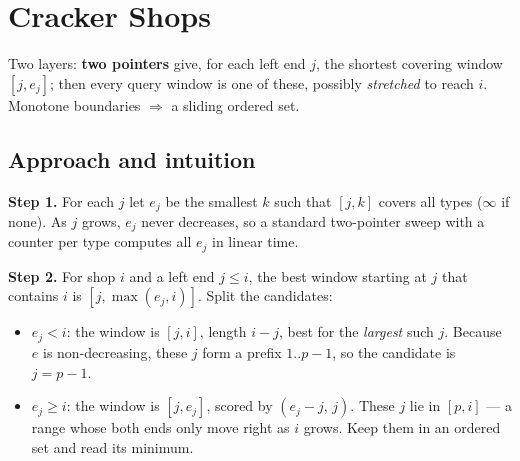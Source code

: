 \section{Cracker Shops}
\label{sec:g-cracker-shops}


\begin{patternbox}
Two layers: \textbf{two pointers} give, for each left end $j$, the shortest
covering window $[j,e_j]$; then every query window is one of these, possibly
\emph{stretched} to reach $i$. Monotone boundaries $\Rightarrow$ a sliding
ordered set.
\end{patternbox}

\subsection*{Approach and intuition}

\textbf{Step 1.} For each $j$ let $e_j$ be the smallest $k$ such that
$[j,k]$ covers all types ($\infty$ if none). As $j$ grows, $e_j$ never
decreases, so a standard two-pointer sweep with a counter per type computes
all $e_j$ in linear time.

\textbf{Step 2.} For shop $i$ and a left end $j\le i$, the best window starting
at $j$ that contains $i$ is $[j,\max(e_j,i)]$. Split the candidates:
\begin{itemize}
  \item $e_j<i$: the window is $[j,i]$, length $i-j$, best for the
        \emph{largest} such $j$. Because $e$ is non-decreasing, these $j$ form a
        prefix $1..p-1$, so the candidate is $j=p-1$.
  \item $e_j\ge i$: the window is $[j,e_j]$, scored by $(e_j-j,\,j)$. These
        $j$ lie in $[p,i]$ --- a range whose both ends only move right as $i$
        grows. Keep them in an ordered set and read its minimum.
\end{itemize}

\begin{center}
\end{center}

